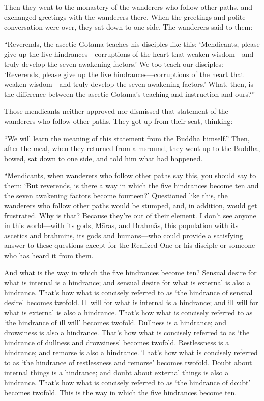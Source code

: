 \documentclass[12pt,openany]{book}%
\begin{document}
Then they went to the monastery of the wanderers who follow other paths, and exchanged greetings with the wanderers there. When the greetings and polite conversation were over, they sat down to one side. The wanderers said to them: 

“Reverends, the ascetic Gotama teaches his disciples like this: ‘Mendicants, please give up the five hindrances—corruptions of the heart that weaken wisdom—and truly develop the seven awakening factors.’ We too teach our disciples: ‘Reverends, please give up the five hindrances—corruptions of the heart that weaken wisdom—and truly develop the seven awakening factors.’ What, then, is the difference between the ascetic Gotama’s teaching and instruction and ours?” 

Those mendicants neither approved nor dismissed that statement of the wanderers who follow other paths. They got up from their seat, thinking: 

“We will learn the meaning of this statement from the Buddha himself.” Then, after the meal, when they returned from almsround, they went up to the Buddha, bowed, sat down to one side, and told him what had happened. 

“Mendicants, when wanderers who follow other paths say this, you should say to them: ‘But reverends, is there a way in which the five hindrances become ten and the seven awakening factors become fourteen?’ Questioned like this, the wanderers who follow other paths would be stumped, and, in addition, would get frustrated. Why is that? Because they’re out of their element. I don’t see anyone in this world—with its gods, \textsanskrit{Māras}, and \textsanskrit{Brahmās}, this population with its ascetics and brahmins, its gods and humans—who could provide a satisfying answer to these questions except for the Realized One or his disciple or someone who has heard it from them. 

And what is the way in which the five hindrances become ten? Sensual desire for what is internal is a hindrance; and sensual desire for what is external is also a hindrance. That’s how what is concisely referred to as ‘the hindrance of sensual desire’ becomes twofold. Ill will for what is internal is a hindrance; and ill will for what is external is also a hindrance. That’s how what is concisely referred to as ‘the hindrance of ill will’ becomes twofold. Dullness is a hindrance; and drowsiness is also a hindrance. That’s how what is concisely referred to as ‘the hindrance of dullness and drowsiness’ becomes twofold. Restlessness is a hindrance; and remorse is also a hindrance. That’s how what is concisely referred to as ‘the hindrance of restlessness and remorse’ becomes twofold. Doubt about internal things is a hindrance; and doubt about external things is also a hindrance. That’s how what is concisely referred to as ‘the hindrance of doubt’ becomes twofold. This is the way in which the five hindrances become ten. 
\end{document}
